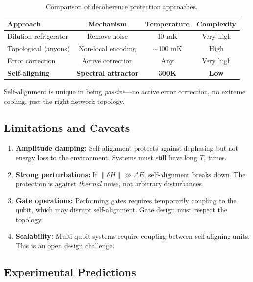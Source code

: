\documentclass[11pt,a4paper]{article}
\theoremstyle{plain}
\theoremstyle{definition}
\theoremstyle{remark}
\begin{document}
\begin{table}[H]
\centering
\begin{tabular}{@{}lccc@{}}
\toprule
\textbf{Approach} & \textbf{Mechanism} & \textbf{Temperature} & \textbf{Complexity} \\
\midrule
Dilution refrigerator & Remove noise & 10 mK & Very high \\
Topological (anyons) & Non-local encoding & $\sim$100 mK & High \\
Error correction & Active correction & Any & Very high \\
\textbf{Self-aligning} & \textbf{Spectral attractor} & \textbf{300K} & \textbf{Low} \\
\bottomrule
\end{tabular}
\caption{Comparison of decoherence protection approaches.}
\end{table}

Self-alignment is unique in being \emph{passive}---no active error correction, no extreme cooling, just the right network topology.

\subsection{Limitations and Caveats}

\begin{enumerate}
    \item \textbf{Amplitude damping:} Self-alignment protects against dephasing but not energy loss to the environment. Systems must still have long $T_1$ times.
    
    \item \textbf{Strong perturbations:} If $\|\delta H\| \gg \Delta E$, self-alignment breaks down. The protection is against \emph{thermal} noise, not arbitrary disturbances.
    
    \item \textbf{Gate operations:} Performing gates requires temporarily coupling to the qubit, which may disrupt self-alignment. Gate design must respect the topology.
    
    \item \textbf{Scalability:} Multi-qubit systems require coupling between self-aligning units. This is an open design challenge.
\end{enumerate}

\subsection{Experimental Predictions}
\end{document}
